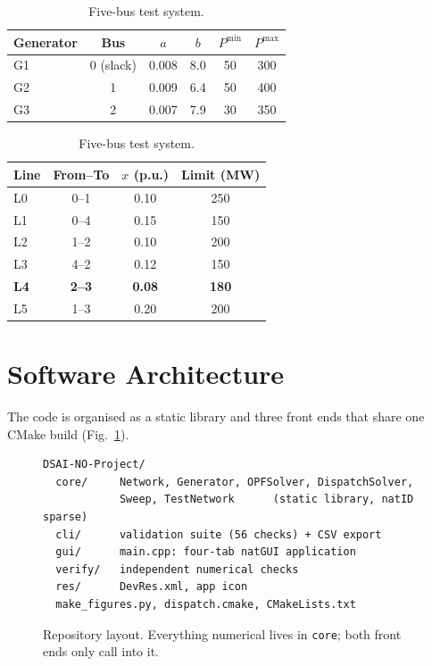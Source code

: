 \documentclass[conference]{IEEEtran}
\begin{document}
\begin{table}[t]
\caption{Five-bus test system.}
\label{tab:5bus}
\centering
\begin{tabular}{@{}lccccc@{}}
\toprule
Generator & Bus & $a$ & $b$ & $P^{\min}$ & $P^{\max}$ \\
\midrule
G1 & 0 (slack) & 0.008 & 8.0 & 50 & 300 \\
G2 & 1 & 0.009 & 6.4 & 50 & 400 \\
G3 & 2 & 0.007 & 7.9 & 30 & 350 \\
\bottomrule
\end{tabular}
\vspace{4pt}

\begin{tabular}{@{}lccc@{}}
\toprule
Line & From--To & $x$ (p.u.) & Limit (MW) \\
\midrule
L0 & 0--1 & 0.10 & 250 \\
L1 & 0--4 & 0.15 & 150 \\
L2 & 1--2 & 0.10 & 200 \\
L3 & 4--2 & 0.12 & 150 \\
\textbf{L4} & \textbf{2--3} & \textbf{0.08} & \textbf{180} \\
L5 & 1--3 & 0.20 & 200 \\
\bottomrule
\end{tabular}
\end{table}

\section{Software Architecture}
The code is organised as a static library and three front ends that share one CMake build (Fig.~\ref{fig:arch}).

\begin{figure}[t]
\centering
\begin{lstlisting}[frame=none,basicstyle=\ttfamily\scriptsize]
DSAI-NO-Project/
  core/     Network, Generator, OPFSolver, DispatchSolver,
            Sweep, TestNetwork      (static library, natID sparse)
  cli/      validation suite (56 checks) + CSV export
  gui/      main.cpp: four-tab natGUI application
  verify/   independent numerical checks
  res/      DevRes.xml, app icon
  make_figures.py, dispatch.cmake, CMakeLists.txt
\end{lstlisting}
\caption{Repository layout. Everything numerical lives in \texttt{core}; both front ends only call into it.}
\label{fig:arch}
\end{figure}
\end{document}
